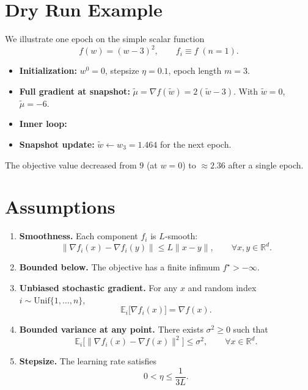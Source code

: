 \documentclass{article}
\newcommand{\E}{\mathbb{E}}
\newcommand{\R}{\mathbb{R}}
\begin{document}
\section*{Dry Run Example}
We illustrate one epoch on the simple scalar function
\[
f(w)=(w-3)^2,\qquad f_i\equiv f\;(n=1).
\]
\begin{itemize}
\item \textbf{Initialization:} $w^{0}=0$, stepsize $\eta=0.1$, epoch length $m=3$.
\item \textbf{Full gradient at snapshot:} $\tilde{\mu}= \nabla f(\tilde{w}) = 2(\tilde{w}-3)$. With $\tilde{w}=0$, $\tilde{\mu}= -6$.
\item \textbf{Inner loop:}
\item \textbf{Snapshot update:} $\gets w_3=1.464$ for the next epoch.
\end{itemize}
The objective value decreased from $9$ (at $w=0$) to $$ after a single epoch.

\section*{Assumptions}
\begin{enumerate}
\item \textbf{Smoothness.} Each component $f_i$ is $L$‑smooth:
\[
\|\nabla f_i(x)-\nabla f_i(y)\|\le L\|x-y\|,\qquad\forall x,y\in\R^{d}. \tag{A1}
\]
\item \textbf{Bounded below.} The objective has a finite infimum $f^{\star}>-\infty$.
\item \textbf{Unbiased stochastic gradient.} For any $x$ and random index $i\sim{}\{1,\dots,n\}$,
\[
\E_{i}\big[\nabla f_i(x)\big]=\nabla f(x). \tag{A2}
\]
\item \textbf{Bounded variance at any point.} There exists $\sigma^{2}$ such that
\[
\E_{i}\big[\|\nabla f_i(x)-\nabla f(x)\|^{2}\big]\le\sigma^{2},\qquad\forall x\in\R^{d}. \tag{A3}
\]
\item \textbf{Stepsize.} The learning rate satisfies
\[
0<\eta\le\frac{1}{3L}. \tag{A4}
\]
\end{enumerate}
\end{document}
